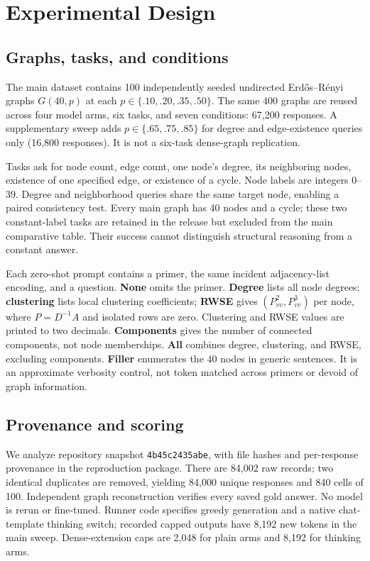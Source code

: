 \documentclass[11pt]{article}
\begin{document}
\section{Experimental Design}
\subsection{Graphs, tasks, and conditions}
The main dataset contains 100 independently seeded undirected Erd\H{o}s--R\'enyi graphs $G(40,p)$ at each $p\in\{.10,.20,.35,.50\}$. The same 400 graphs are reused across four model arms, six tasks, and seven conditions: 67,200 responses. A supplementary sweep adds $p\in\{.65,.75,.85\}$ for degree and edge-existence queries only (16,800 responses). It is not a six-task dense-graph replication.

Tasks ask for node count, edge count, one node's degree, its neighboring nodes, existence of one specified edge, or existence of a cycle. Node labels are integers 0--39. Degree and neighborhood queries share the same target node, enabling a paired consistency test. Every main graph has 40 nodes and a cycle; these two constant-label tasks are retained in the release but excluded from the main comparative table. Their success cannot distinguish structural reasoning from a constant answer.

Each zero-shot prompt contains a primer, the same incident adjacency-list encoding, and a question. \textbf{None} omits the primer. \textbf{Degree} lists all node degrees; \textbf{clustering} lists local clustering coefficients; \textbf{RWSE} gives $(P^2_{vv},P^3_{vv})$ per node, where $P=D^{-1}A$ and isolated rows are zero. Clustering and RWSE values are printed to two decimals. \textbf{Components} gives the number of connected components, not node memberships. \textbf{All} combines degree, clustering, and RWSE, excluding components. \textbf{Filler} enumerates the 40 nodes in generic sentences. It is an approximate verbosity control, not token matched across primers or devoid of graph information.

\subsection{Provenance and scoring}
We analyze repository snapshot \texttt{4b45c2435abe}, with file hashes and per-response provenance in the reproduction package. There are 84,002 raw records; two identical duplicates are removed, yielding 84,000 unique responses and 840 cells of 100. Independent graph reconstruction verifies every saved gold answer. No model is rerun or fine-tuned. Runner code specifies greedy generation and a native chat-template thinking switch; recorded capped outputs have 8,192 new tokens in the main sweep. Dense-extension caps are 2,048 for plain arms and 8,192 for thinking arms.
\end{document}
